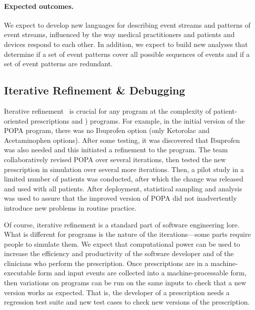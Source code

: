\paragraph{Expected outcomes.}
We expect to develop new languages for describing event streams and
patterns of event streams, influenced by the way medical practitioners
and patients and devices respond to each other. In addition, we expect
to build new analyses that determine if a set of event patterns cover
all possible sequences of events and if a set of event patterns are
redundant.

\subsection{Iterative Refinement \& Debugging}\label{sec:iterative}

Iterative refinement~\citep{boehm:spiral} is crucial for any program
at the complexity of patient-oriented prescriptions and \poppl{})
programs. For example, in the initial version of the POPA program,
there was no Ibuprofen option (only Ketorolac and Acetaminophen
options). After some testing, it was discovered that Ibuprofen was
also needed and this initiated a refinement to the program. The team
collaboratively revised POPA over several iterations, then tested the
new prescription in simulation over several more iterations. Then, a
pilot study in a limited number of patients was conducted, after which
the change was released and used with all patients. After deployment,
statistical sampling and analysis was used to assure that the improved
version of POPA did not inadvertently introduce new problems in
routine practice.

Of course, iterative refinement is a standard part of software
engineering lore. What is different for \poppl{} programs is the
nature of the iterations---some parts require people to simulate
them. We expect that computational power can be used to increase the
efficiency and productivity of the \poppl{} software developer and of
the clinicians who perform the prescription.  Once prescriptions are
in a machine-executable form and input events are collected into a
machine-processable form, then variations on programs can be run on
the same inputs to check that a new version works as expected. That
is, the developer of a prescription needs a regression test suite and
new test cases to check new versions of the prescription.

